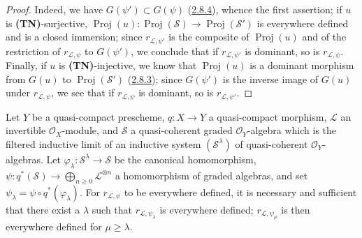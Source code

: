 \begin{proof}
Indeed, we have $G(\psi')\subset G(\psi)$
(\hyperref[II.2.8.4]{2.8.4}), whence the first assertion; if $u$ is
\textbf{(TN)}-surjective,
$\operatorname{Proj}(u):\operatorname{Proj}(\mathcal{S})\to
\operatorname{Proj}(\mathcal{S}')$ is everywhere defined and is a closed
immersion; since $r_{\mathcal{L},\psi'}$ is the composite of
$\operatorname{Proj}(u)$ and of the restriction of $r_{\mathcal{L},\psi}$ to
$G(\psi')$, we conclude that if $r_{\mathcal{L},\psi'}$ is dominant, so is
$r_{\mathcal{L},\psi}$. Finally, if $u$ is
\textbf{(TN)}-injective, we know that $\operatorname{Proj}(u)$ is a dominant
morphism from $G(u)$ to $\operatorname{Proj}(\mathcal{S}')$
(\hyperref[II.2.8.3]{2.8.3}); since $G(\psi')$ is the inverse image of
$G(u)$ under $r_{\mathcal{L},\psi}$, we see that if $r_{\mathcal{L},\psi}$ is
dominant, so is $r_{\mathcal{L},\psi'}$.
\end{proof}

\begin{proposition}[3.7.7]
\label{II.3.7.7}
Let $Y$ be a quasi-compact prescheme, $q:X\to Y$ a quasi-compact morphism,
$\mathcal{L}$ an invertible $\mathcal{O}_X$-module, and $\mathcal{S}$ a
quasi-coherent graded $\mathcal{O}_Y$-algebra which is the filtered inductive
limit of an inductive system $(\mathcal{S}^\lambda)$ of quasi-coherent
$\mathcal{O}_Y$-algebras. Let
$\varphi_\lambda:\mathcal{S}^\lambda\to\mathcal{S}$ be the canonical
homomorphism,
$\psi:q^*(\mathcal{S})\to\bigoplus_{n\geq0}\mathcal{L}^{\otimes n}$ a
homomorphism of graded algebras, and set
$\psi_\lambda=\psi\circ q^*(\varphi_\lambda)$. For
$r_{\mathcal{L},\psi}$ to be everywhere defined, it is necessary and sufficient
that there exist a $\lambda$ such that $r_{\mathcal{L},\psi_\lambda}$ is
everywhere defined; $r_{\mathcal{L},\psi_\mu}$ is then everywhere defined for
$\mu\geq\lambda$.
\end{proposition}

